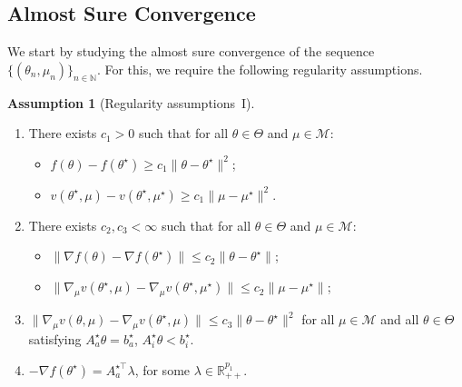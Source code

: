 \documentclass[11pt,a4paper]{article}
\theoremstyle{definition}
\newtheorem{assumption}[theorem]{Assumption}
\begin{document}



\subsection{Almost Sure Convergence}


We start by studying the almost sure convergence of the sequence $\{(\theta_n,\mu_n)\}_{n \in \mathbb N}$. For this, we require the following regularity assumptions.


\begin{assumption}[Regularity assumptions~I]~
\label{assump:as:conv}
\begin{enumerate}[label=(\roman*)]
    \item \label{assump:as:conv:1} There exists $c_1>0$ such that for all $\theta\in \Theta$ and $\mu \in \mathcal M$:
    \begin{itemize}
        \item[(i.1)] \label{assump:as:conv:1.1} ${f}(\theta) - {f}(\theta^\star) \geq c_1 \|\theta - \theta^\star\|^2$;

        \item[(i.2)] \label{assump:as:conv:1.2} $v(\theta^\star,\mu) - v(\theta^\star,\mu^\star) \geq c_1 \|\mu - \mu^\star\|^2$.
    \end{itemize}

    \item \label{assump:as:conv:2} There exists $c_2, c_3 < \infty$ such that for all $\theta\in \Theta$ and $\mu \in \mathcal M$:
    \begin{itemize}
        \item[(ii.1)] \label{assump:as:conv:2.1} $\|\nabla {f}(\theta) - \nabla {f}(\theta^\star)\| \leq c_2 \|\theta-\theta^\star\|$;

        \item[(ii.2)] \label{assump:as:conv:2.2} $\|\nabla_\mu v(\theta^\star,\mu) - \nabla_\mu v(\theta^\star,\mu^\star)\| \leq c_2 \|\mu-\mu^\star\|$;
    \end{itemize}
  \item \label{assump:as:conv:3} $\|\nabla_\mu v(\theta,\mu) - \nabla_\mu v(\theta^\star,\mu)\| \leq c_3 \|\theta-\theta^\star\|^2$ for all $\mu \in \mathcal M$ and all $\theta \in \Theta$ satisfying $A_a^\star \theta = b_a^\star$,  $A_i^\star \theta < b_i^\star$.
    \item \label{assump:as:conv:4} $-\nabla {f}(\theta^\star) = A_a^{\star \top} \lambda$, for some $\lambda \in \mathbb R_{++}^{p_1}$.
\end{enumerate}
\end{assumption}
\end{document}
